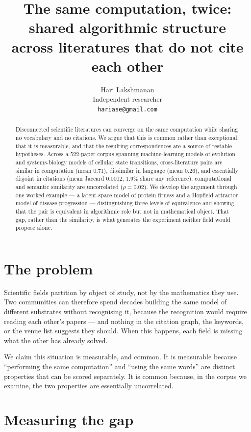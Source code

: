 \documentclass[11pt]{article}
\title{\bfseries The same computation, twice: shared algorithmic structure\\
\large across literatures that do not cite each other}
\author{Hari Lakshmanan\\ \small Independent researcher \\ \small\texttt{hariase@gmail.com}}
\date{}
\begin{document}
\maketitle
\vspace{-2.2em}
\begin{abstract}
Disconnected scientific literatures can converge on the same computation while sharing no vocabulary and no citations. We argue that this is common rather than exceptional, that it is measurable, and that the resulting correspondences are a source of testable hypotheses. Across a $522$-paper corpus spanning machine-learning models of evolution and systems-biology models of cellular state transitions, cross-literature pairs are similar in computation (mean $0.71$), dissimilar in language (mean $0.26$), and essentially disjoint in citations (mean Jaccard $0.0002$; $1.9\%$ share any reference); computational and semantic similarity are uncorrelated ($\rho=0.02$). We develop the argument through one worked example --- a latent-space model of protein fitness and a Hopfield attractor model of disease progression --- distinguishing three levels of equivalence and showing that the pair is equivalent in algorithmic role but not in mathematical object. That gap, rather than the similarity, is what generates the experiment neither field would propose alone.
\end{abstract}

\section{The problem}
Scientific fields partition by object of study, not by the mathematics they use. Two communities can therefore
spend decades building the same model of different substrates without recognising it, because the recognition would
require reading each other's papers --- and nothing in the citation graph, the keywords, or the venue list suggests
they should. When this happens, each field is missing what the other has already solved.

We claim this situation is measurable, and common. It is measurable because ``performing the same computation'' and
``using the same words'' are distinct properties that can be scored separately. It is common because, in the corpus
we examine, the two properties are essentially uncorrelated.

\section{Measuring the gap}\label{sec:methods}
\end{document}
